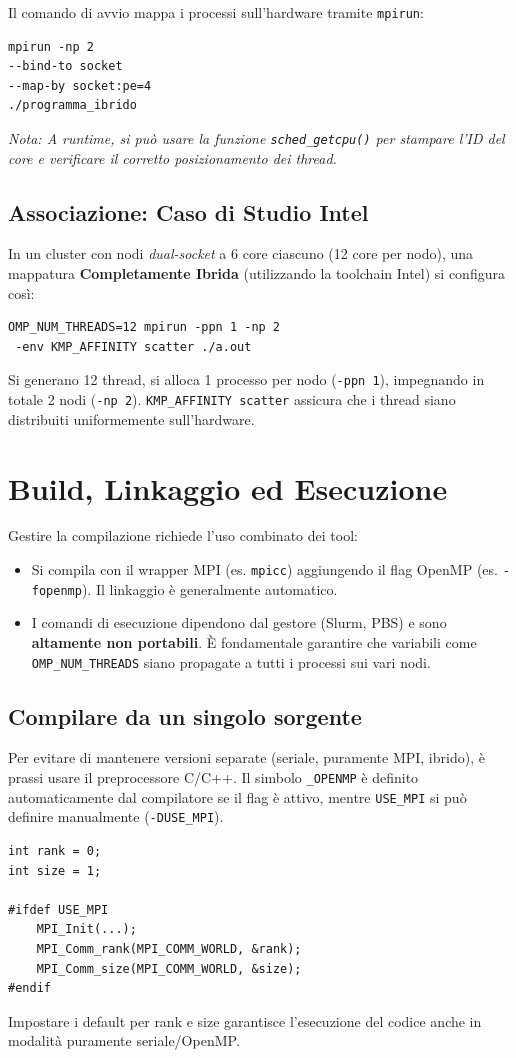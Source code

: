 Il comando di avvio mappa i processi sull'hardware tramite \texttt{mpirun}:
\begin{verbatim}
mpirun -np 2 
--bind-to socket 
--map-by socket:pe=4 
./programma_ibrido
\end{verbatim}
\textit{Nota: A runtime, si può usare la funzione \texttt{sched\_getcpu()} per stampare l'ID del core e verificare il corretto posizionamento dei thread.}

\subsection{Associazione: Caso di Studio Intel}
In un cluster con nodi \textit{dual-socket} a 6 core ciascuno (12 core per nodo), una mappatura \textbf{Completamente Ibrida} (utilizzando la toolchain Intel) si configura così:
\begin{verbatim}
OMP_NUM_THREADS=12 mpirun -ppn 1 -np 2
 -env KMP_AFFINITY scatter ./a.out
\end{verbatim}
Si generano 12 thread, si alloca 1 processo per nodo (\texttt{-ppn 1}), impegnando in totale 2 nodi (\texttt{-np 2}). \texttt{KMP\_AFFINITY scatter} assicura che i thread siano distribuiti uniformemente sull'hardware.


\section{Build, Linkaggio ed Esecuzione}

Gestire la compilazione richiede l'uso combinato dei tool:
\begin{itemize}
    \item Si compila con il wrapper MPI (es. \texttt{mpicc}) aggiungendo il flag OpenMP (es. \texttt{-fopenmp}). Il linkaggio è generalmente automatico.
    \item I comandi di esecuzione dipendono dal gestore (Slurm, PBS) e sono \textbf{altamente non portabili}. È fondamentale garantire che variabili come \texttt{OMP\_NUM\_THREADS} siano propagate a tutti i processi sui vari nodi.
\end{itemize}

\subsection{Compilare da un singolo sorgente}
Per evitare di mantenere versioni separate (seriale, puramente MPI, ibrido), è prassi usare il preprocessore C/C++. Il simbolo \texttt{\_OPENMP} è definito automaticamente dal compilatore se il flag è attivo, mentre \texttt{USE\_MPI} si può definire manualmente (\texttt{-DUSE\_MPI}).
\begin{verbatim}
int rank = 0;
int size = 1;

#ifdef USE_MPI
    MPI_Init(...);
    MPI_Comm_rank(MPI_COMM_WORLD, &rank);
    MPI_Comm_size(MPI_COMM_WORLD, &size);
#endif
\end{verbatim}
Impostare i default per rank e size garantisce l'esecuzione del codice anche in modalità puramente seriale/OpenMP.


